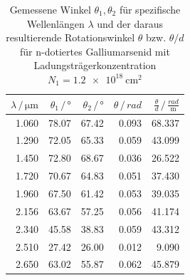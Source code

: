 \begin{table}
    \centering
    \caption{Gemessene Winkel $\theta_1, \theta_2$ für spezifische Wellenlängen $\lambda$ und der daraus resultierende Rotationswinkel $\theta$ bzw. $\theta/d$ für n-dotiertes Galliumarsenid mit Ladungsträgerkonzentration $N_1 = \qty{1.2e18}{\centi\metre^2}$}
    \label{tab:N1}
    \begin{tabular}{r r r r r}
        \toprule
        $\lambda \,/\, \unit{\micro\metre}$ & $\theta_1 \,/\, \unit{\degree}$ & $\theta_2 \,/\, \unit{\degree}$ & $\theta \,/\, \unit{rad}$ & $\frac{\theta}{d} \,/\, \frac{rad}{\unit{\metre}}$ \\
        \midrule
        1.060 & 78.07 & 67.42 & 0.093 & 68.337 \\
        1.290 & 72.05 & 65.33 & 0.059 & 43.099 \\
        1.450 & 72.80 & 68.67 & 0.036 & 26.522 \\
        1.720 & 70.67 & 64.83 & 0.051 & 37.430 \\
        1.960 & 67.50 & 61.42 & 0.053 & 39.035 \\
        2.156 & 63.67 & 57.25 & 0.056 & 41.174 \\
        2.340 & 45.58 & 38.83 & 0.059 & 43.312 \\
        2.510 & 27.42 & 26.00 & 0.012 & 9.090 \\
        2.650 & 63.02 & 55.87 & 0.062 & 45.879 \\
        \bottomrule
    \end{tabular}
\end{table}

